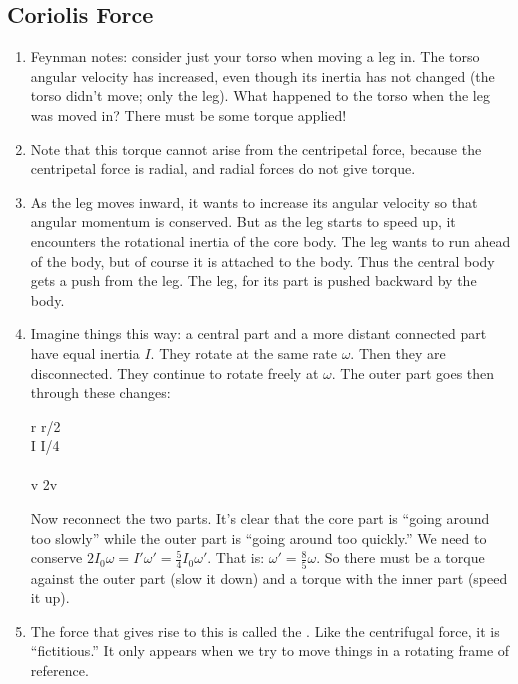 \subsection{Coriolis Force}

\begin{enumerate}

  \item Feynman notes: consider just your torso when moving a leg in.
  The torso angular velocity has increased, even though its inertia has
  not changed (the torso didn't move; only the leg). What happened to
  the torso when the leg was moved in? There must be some torque
  applied!

  \item Note that this torque cannot arise from the centripetal force,
  because the centripetal force is radial, and radial forces do not give
  torque.

  \item As the leg moves inward, it wants to increase its angular
  velocity so that angular momentum is conserved. But as the leg starts
  to speed up, it encounters the rotational inertia of the core body.
  The leg wants to run ahead of the body, but of course it is attached
  to the body. Thus the central body gets a push from the leg. The leg,
  for its part is pushed backward by the body.

  \item Imagine things this way: a central part and a more distant
  connected part have equal inertia $I$. They rotate at the same rate
  $\omega$. Then they are disconnected. They continue to rotate freely
  at $\omega$. The outer part goes then through these changes:

  \begin{nedqn}
    r \mapstocol r/2
  \\
    I \mapstocol I/4
  \\
    \omega {}\omega
  \\
    v \mapstocol 2v
  \end{nedqn}

  \noindent
  Now reconnect the two parts. It's clear that the core part is ``going
  around too slowly'' while the outer part is ``going around too
  quickly.'' We need to conserve $2I_0 \omega = I' \omega' = \frac{5}{4}
  I_0 \omega'$. That is: $\omega' = \frac{8}{5} \omega$. So there must
  be a torque against the outer part (slow it down) and a torque with
  the inner part (speed it up).

  \item The force that gives rise to this is called the . Like the centrifugal force, it is ``fictitious.'' It only
  appears when we try to move things in a rotating frame of reference.


\end{enumerate}
